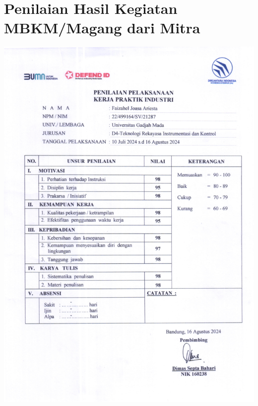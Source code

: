 \section{Penilaian Hasil Kegiatan MBKM/Magang dari Mitra}
\includegraphics[scale=0.7]{dokumen/nilai-perusahaan.pdf}


\newpage
